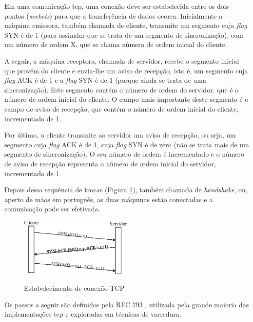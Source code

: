 Em uma comunicação \gls{tcp}, uma conexão deve ser estabelecida entre os dois pontos (\textit{sockets}) para que a transferência de dados ocorra.
Inicialmente a máquina emissora, também chamada de cliente, transmite um segmento cuja \textit{flag} SYN é de 1 (para assinalar que se trata de um segmento de sincronização), com um número de ordem X, que se chama número de ordem inicial do cliente.

A seguir, a máquina receptora, chamada de servidor, recebe o segmento inicial que provém do cliente e envia-lhe um aviso de recepção, isto é, um segmento cuja \textit{flag} ACK é de 1 e a \textit{flag} SYN é de 1 (porque ainda se trata de uma sincronização). Este segmento contém o número de ordem do servidor, que é o número de ordem inicial do cliente. O campo mais importante deste segmento é o campo de aviso de recepção, que contém o número de ordem inicial do cliente, incrementado de 1.

Por último, o cliente transmite ao servidor um aviso de recepção, ou seja, um segmento cuja \textit{flag} ACK é de 1, cuja \textit{flag} SYN é de zero (não se trata mais de um segmento de sincronização). O seu número de ordem é incrementado e o número de aviso de recepção representa o número de ordem inicial do servidor, incrementado de 1.

Depois dessa sequência de trocas (Figura \ref{fig:troca-tcp}), também chamada de \textit{handshake}, ou, aperto de mãos em português, as duas máquinas estão conectadas e a comunicação pode ser efetivada.

\begin{figure}[H]
  \centering
  \caption{Estabelecimento de conexão TCP}
  \includegraphics[width=0.5\textwidth]{images/conexao-tcp.eps}
  \label{fig:troca-tcp}
\end{figure}
\FloatBarrier

Os passos a seguir são definidos pela RFC 793 \cite{rfc793}, utilizada pela grande maioria das implementações \gls{tcp} e exploradas em técnicas de varredura.

